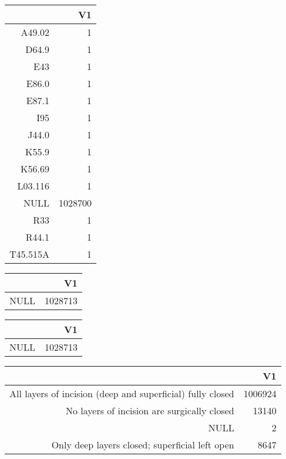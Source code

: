 \bigskip\bigskip
\centering
\begin{tabular}{rr}
  \hline
 & V1 \\ 
  \hline
A49.02 &   1 \\ 
  D64.9 &   1 \\ 
  E43 &   1 \\ 
  E86.0 &   1 \\ 
  E87.1 &   1 \\ 
  I95 &   1 \\ 
  J44.0 &   1 \\ 
  K55.9 &   1 \\ 
  K56.69 &   1 \\ 
  L03.116 &   1 \\ 
  NULL & 1028700 \\ 
  R33 &   1 \\ 
  R44.1 &   1 \\ 
  T45.515A &   1 \\ 
   \hline
\end{tabular}

\bigskip\bigskip
\centering
\begin{tabular}{rr}
  \hline
 & V1 \\ 
  \hline
NULL & 1028713 \\ 
   \hline
\end{tabular}

\bigskip\bigskip
\centering
\begin{tabular}{rr}
  \hline
 & V1 \\ 
  \hline
NULL & 1028713 \\ 
   \hline
\end{tabular}

\bigskip\bigskip
\centering
\begin{tabular}{rr}
  \hline
 & V1 \\ 
  \hline
All layers of incision (deep and superficial) fully closed & 1006924 \\ 
  No layers of incision are surgically closed & 13140 \\ 
  NULL &   2 \\ 
  Only deep layers closed; superficial left open & 8647 \\ 
   \hline
\end{tabular}

